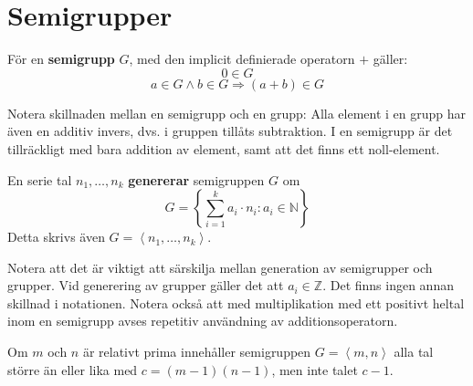\section{Semigrupper}

\begin{Definition}
För en \textbf{semigrupp} $G$, med den implicit definierade operatorn $+$ gäller:
\[0 \in G\]
\[a \in G \wedge b \in G \Longrightarrow (a + b) \in G\]
\end{Definition}

Notera skillnaden mellan en semigrupp och en grupp: Alla element i en grupp har även en additiv invers, dvs. i gruppen tillåts subtraktion. I en semigrupp är det tillräckligt med bara addition av element, samt att det finns ett noll-element.

\begin{Definition}
En serie tal $n_1, \ldots, n_k$ \textbf{genererar} semigruppen $G$ om
\[G = \left\{\sum_{i=1}^{k} a_i \cdot n_i : a_i \in \mathbb{N}\right\}\]
Detta skrivs även $G = \left<n_1, \ldots, n_k \right>$.
\end{Definition}

Notera att det är viktigt att särskilja mellan generation av semigrupper och grupper. Vid generering av grupper gäller det att $a_i \in \mathbb{Z}$. Det finns ingen annan skillnad i notationen. Notera också att med multiplikation med ett positivt heltal inom en semigrupp avses repetitiv användning av additionsoperatorn.

\begin{Theorem}
\label{S1}
Om $m$ och $n$ är relativt prima innehåller semigruppen $G = \left<m, n\right>$ alla tal större än eller lika med $c = (m - 1)(n - 1)$, men inte talet $c - 1$.
\end{Theorem}

